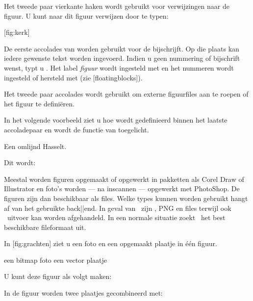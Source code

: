 Het tweede paar vierkante haken wordt gebruikt voor
verwijzingen naar de figuur. U kunt naar dit figuur
verwijzen door te typen:

\starttypen
{}[fig:kerk]
\stoptypen

De eerste accolades van \type{\plaatsfiguur} worden gebruikt
voor de bijschrijft. Op die plaats kan iedere gewenste tekst
worden ingevoerd. Indien u geen nummering of bijschrift
wenst, typt u . Het label {\em figuur} wordt
ingesteld met \type{\stelblokkopjesin} en het nummeren wordt
ingesteld of hersteld met \type{\stelnummerenin} (zie
[floatingblocks]).

Het tweede paar accolades wordt gebruikt om externe
figuurfiles aan te roepen of het figuur te defini\"eren.

In het volgende voorbeeld ziet u hoe
 wordt gedefinieerd binnen het
laatste accoladepaar en wordt de functie van
\type{\plaatsfiguur{}{}} toegelicht.

\startbuffer
\plaatsfiguur
  {Een omlijnd Hasselt.}
  {}

\stopbuffer

\typebuffer

Dit wordt:

\haalbuffer

Meestal worden figuren opgemaakt of opgewerkt in pakketten
als Corel Draw of Illustrator en foto's worden --- na inscannen
--- opgewerkt met PhotoShop. De figuren zijn dan beschikbaar als
files. Welke types kunnen worden gebruikt hangt af van het
gebruikte back||end. In geval van \PDFTEX\ zijn , \type
{PNG} en  files terwijl ook \METAPOST\ uitvoer kan
worden afgehandeld. In een normale situatie zoekt \CONTEXT\ het
best beschikbare fileformaat uit.

In [fig:grachten] ziet u een foto en een
opgemaakt plaatje in \'e\'en figuur.

\startbuffer
{}
  {\startcombinatie[2*1]
     {\externfiguur[ma-cb-03][breedte=.4\tekstbreedte]}
        {een bitmap foto}
     {\externfiguur[gracht][breedte=.4\tekstbreedte]}
        {een vector plaatje}
   \stopcombinatie}
\stopbuffer

\haalbuffer

U kunt deze figuur als volgt maken:

\typebuffer

In de figuur worden twee plaatjes gecombineerd met:

